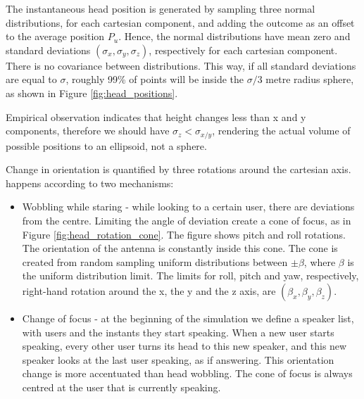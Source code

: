 The instantaneous head position is generated by sampling three normal distributions, for each cartesian component, and adding the outcome as an offset to the average position $P_u$. Hence, the normal distributions have mean zero and standard deviations $(\sigma_x, \sigma_y, \sigma_z)$, respectively for each cartesian component. There is no covariance between distributions. This way, if all standard deviations are equal to $\sigma$, roughly 99\% of points will be inside the $\sigma/3$ metre radius sphere, as shown in Figure \ref{fig:head_positions}.


Empirical observation indicates that height changes less than x and y components, therefore we should have $\sigma_z < \sigma_{x/y}$, rendering the actual volume of possible positions to an ellipsoid, not a sphere. 


Change in orientation is quantified by three rotations around the cartesian axis. happens according to two mechanisms: 


\begin{itemize}
    \item Wobbling while staring - while looking to a certain user, there are deviations from the centre. Limiting the angle of deviation create a cone of focus, as in Figure \ref{fig:head_rotation_cone}. The figure shows pitch and roll rotations. The orientation of the antenna is constantly inside this cone. The cone is created from random sampling uniform distributions between $\pm \beta$, where $\beta$ is the uniform distribution limit. The limits for roll, pitch and yaw, respectively, right-hand rotation around the x, the y and the z axis, are $(\beta_x, \beta_y, \beta_z)$.
    \item Change of focus - at the beginning of the simulation we define a speaker list, with users and the instants they start speaking. When a new user starts speaking, every other user turns its head to this new speaker, and this new speaker looks at the last user speaking, as if answering. This orientation change is more accentuated than head wobbling. The cone of focus is always centred at the user that is currently speaking.
\end{itemize}



